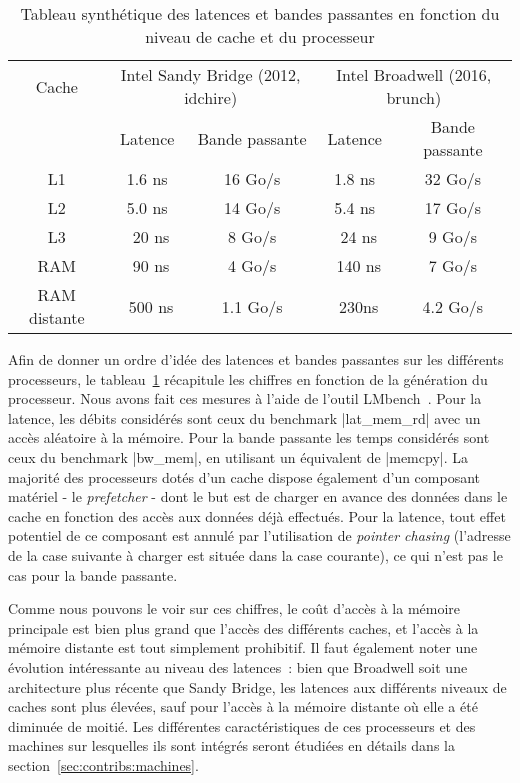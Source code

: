 \begin{table}[ht]
\def\arraystretch{1.5}
\centering
\begin{tabular}{|c||c|c|c|c|}\hline
  Cache & \multicolumn{2}{c|}{Intel Sandy Bridge (2012, idchire)} & \multicolumn{2}{c|}{Intel Broadwell (2016, brunch)}  \\ \cline{2-5}
 & Latence & Bande passante & Latence & Bande passante \\ \hline
 L1 & 1.6 ns & 16 Go/s & 1.8 ns & 32 Go/s \\ \hline
 L2 & 5.0 ns & 14 Go/s & 5.4 ns & 17 Go/s \\ \hline
 L3 & ~20 ns & 8 Go/s & ~24 ns & 9 Go/s \\ \hline
 RAM & ~90 ns & 4 Go/s & ~140 ns & 7 Go/s \\ \hline
 RAM distante & ~500 ns & 1.1 Go/s & ~230ns & 4.2 Go/s \\ \hline
\end{tabular}
\caption{Tableau synthétique des latences et bandes passantes en fonction du niveau de cache et du processeur}\label{tab:synthese-processeurs}
\end{table}

Afin de donner un ordre d'idée des latences et bandes passantes sur les différents processeurs, le tableau~\ref{tab:synthese-processeurs} récapitule les chiffres en fonction de la génération du processeur.
Nous avons fait ces mesures à l'aide de l'outil LMbench~\cite{McVoy1996}. Pour la latence, les débits considérés sont ceux du benchmark |lat_mem_rd| avec un accès aléatoire à la mémoire.
Pour la bande passante les temps considérés sont ceux du benchmark |bw_mem|, en utilisant un équivalent de |memcpy|.
La majorité des processeurs dotés d'un cache dispose également d'un composant matériel - le \emph{prefetcher} - dont le but est de charger en avance des données dans le cache en fonction des accès aux données déjà effectués.
Pour la latence, tout effet potentiel de ce composant est annulé par l'utilisation de \emph{pointer chasing} (l'adresse de la case suivante à charger est située dans la case courante), ce qui n'est pas le cas pour la bande passante.

Comme nous pouvons le voir sur ces chiffres, le coût d'accès à la mémoire principale est bien plus grand que l'accès des différents caches, et l'accès à la mémoire distante est tout simplement prohibitif.
Il faut également noter une évolution intéressante au niveau des latences~: bien que Broadwell soit une architecture plus récente que Sandy Bridge, les latences aux différents niveaux de caches sont plus élevées, sauf pour l'accès à la mémoire distante où elle a été diminuée de moitié.
Les différentes caractéristiques de ces processeurs et des machines sur lesquelles ils sont intégrés seront étudiées en détails dans la section~\ref{sec:contribs:machines}.


